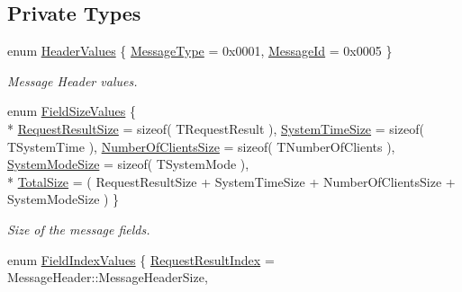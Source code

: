 \subsection*{Private Types}
\begin{DoxyCompactItemize}
\item 
enum \hyperlink{class_terra_swarm_1_1_synchronous_1_1_client_connection_response_ae5b6f6ce8e9057779e6115b9d10f9f27}{Header\-Values} \{ \hyperlink{class_terra_swarm_1_1_synchronous_1_1_client_connection_response_ae5b6f6ce8e9057779e6115b9d10f9f27a3d9f125f956d841cb53726088daf9f4d}{Message\-Type} = 0x0001, 
\hyperlink{class_terra_swarm_1_1_synchronous_1_1_client_connection_response_ae5b6f6ce8e9057779e6115b9d10f9f27a6a76dfe62910631da6f001cf65d1ab73}{Message\-Id} = 0x0005
 \}
\begin{DoxyCompactList}\small\item\em Message Header values. \end{DoxyCompactList}\item 
enum \hyperlink{class_terra_swarm_1_1_synchronous_1_1_client_connection_response_a3933c56d09c6ccf4f1b533024d9d4b08}{Field\-Size\-Values} \{ \\*
\hyperlink{class_terra_swarm_1_1_synchronous_1_1_client_connection_response_a3933c56d09c6ccf4f1b533024d9d4b08aec725d8333b75b6c1cf36a1703d8712f}{Request\-Result\-Size} = sizeof( T\-Request\-Result ), 
\hyperlink{class_terra_swarm_1_1_synchronous_1_1_client_connection_response_a3933c56d09c6ccf4f1b533024d9d4b08ace1096317246657c7174cc95e7ae42fd}{System\-Time\-Size} = sizeof( T\-System\-Time ), 
\hyperlink{class_terra_swarm_1_1_synchronous_1_1_client_connection_response_a3933c56d09c6ccf4f1b533024d9d4b08ad751beae96e2b6b6d55e322c762772c1}{Number\-Of\-Clients\-Size} = sizeof( T\-Number\-Of\-Clients ), 
\hyperlink{class_terra_swarm_1_1_synchronous_1_1_client_connection_response_a3933c56d09c6ccf4f1b533024d9d4b08a967e285d0517d9d1920b562699ed8080}{System\-Mode\-Size} = sizeof( T\-System\-Mode ), 
\\*
\hyperlink{class_terra_swarm_1_1_synchronous_1_1_client_connection_response_a3933c56d09c6ccf4f1b533024d9d4b08a99f73dfa527e590c0f7cb12fe47e495a}{Total\-Size} = ( Request\-Result\-Size + System\-Time\-Size + Number\-Of\-Clients\-Size + System\-Mode\-Size )
 \}
\begin{DoxyCompactList}\small\item\em Size of the message fields. \end{DoxyCompactList}\item 
enum \hyperlink{class_terra_swarm_1_1_synchronous_1_1_client_connection_response_a4cbf4ea0e840420400a931390a8acfbd}{Field\-Index\-Values} \{ \hyperlink{class_terra_swarm_1_1_synchronous_1_1_client_connection_response_a4cbf4ea0e840420400a931390a8acfbda71c63341170df807c76e11e47c8cb62e}{Request\-Result\-Index} = Message\-Header\-:\-:Message\-Header\-Size, 

\end{DoxyCompactItemize}
